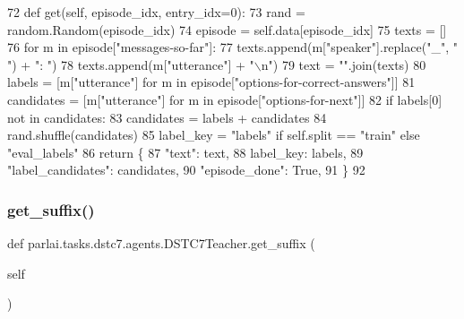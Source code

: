 \begin{DoxyCode}
72     \textcolor{keyword}{def }get(self, episode\_idx, entry\_idx=0):
73         rand = random.Random(episode\_idx)
74         episode = self.data[episode\_idx]
75         texts = []
76         \textcolor{keywordflow}{for} m \textcolor{keywordflow}{in} episode[\textcolor{stringliteral}{"messages-so-far"}]:
77             texts.append(m[\textcolor{stringliteral}{"speaker"}].replace(\textcolor{stringliteral}{"\_"}, \textcolor{stringliteral}{" "}) + \textcolor{stringliteral}{": "})
78             texts.append(m[\textcolor{stringliteral}{"utterance"}] + \textcolor{stringliteral}{"\(\backslash\)n"})
79         text = \textcolor{stringliteral}{""}.join(texts)
80         labels = [m[\textcolor{stringliteral}{"utterance"}] \textcolor{keywordflow}{for} m \textcolor{keywordflow}{in} episode[\textcolor{stringliteral}{"options-for-correct-answers"}]]
81         candidates = [m[\textcolor{stringliteral}{"utterance"}] \textcolor{keywordflow}{for} m \textcolor{keywordflow}{in} episode[\textcolor{stringliteral}{"options-for-next"}]]
82         \textcolor{keywordflow}{if} labels[0] \textcolor{keywordflow}{not} \textcolor{keywordflow}{in} candidates:
83             candidates = labels + candidates
84         rand.shuffle(candidates)
85         label\_key = \textcolor{stringliteral}{"labels"} \textcolor{keywordflow}{if} self.split == \textcolor{stringliteral}{"train"} \textcolor{keywordflow}{else} \textcolor{stringliteral}{"eval\_labels"}
86         \textcolor{keywordflow}{return} \{
87             \textcolor{stringliteral}{"text"}: text,
88             label\_key: labels,
89             \textcolor{stringliteral}{"label\_candidates"}: candidates,
90             \textcolor{stringliteral}{"episode\_done"}: \textcolor{keyword}{True},
91         \}
92 
\end{DoxyCode}
\mbox{\label{classparlai_1_1tasks_1_1dstc7_1_1agents_1_1DSTC7Teacher_a2355675a4798e716d6d5788ba9de109e}} 
\subsubsection{\texorpdfstring{get\+\_\+suffix()}{get\_suffix()}}
{\footnotesize\ttfamily def parlai.\+tasks.\+dstc7.\+agents.\+D\+S\+T\+C7\+Teacher.\+get\+\_\+suffix (\begin{DoxyParamCaption}\item[{}]{self }\end{DoxyParamCaption})}



